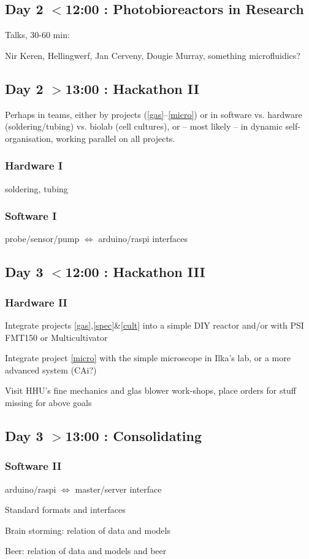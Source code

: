 \documentclass[12pt,a4paper]{article}
\begin{document}
\subsection{Day 2 $<$12:00 : Photobioreactors in Research}

Talks, 30-60 min:

Nir Keren, Hellingwerf, Jan Cerveny, Dougie Murray,
something microfluidics?

\subsection{Day 2 $>$13:00 : Hackathon II}

Perhaps in teams, either by projects (\ref{gas}--\ref{micro}) or in
software vs. hardware (soldering/tubing) vs. biolab (cell cultures),
or -- most likely -- in dynamic self-organisation, working parallel on
all projects.

\subsubsection{Hardware I} 
soldering, tubing

\subsubsection{Software I} 
probe/sensor/pump $\Leftrightarrow$ arduino/raspi interfaces

\subsection{Day 3 $<$12:00 : Hackathon III}

\subsubsection{Hardware II} 
Integrate projects \ref{gas},\ref{spec}\&\ref{cult} into a simple DIY
reactor and/or with PSI FMT150 or Multicultivator

Integrate project \ref{micro} with the simple microscope in Ilka's lab,
or a more advanced system (CAi?)

Visit HHU's fine mechanics and glas blower work-shops, place orders 
for stuff missing for above goals


\subsection{Day 3 $>$13:00 : Consolidating}

\subsubsection{Software II}
arduino/raspi $\Leftrightarrow$  master/server interface

Standard formats and interfaces

Brain storming: relation of data and models

Beer: relation of data and models and beer
\end{document}
